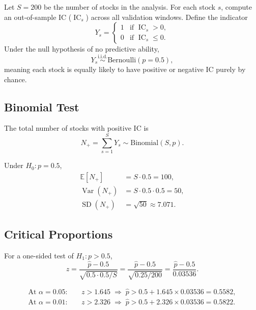 \documentclass[11pt,a4paper]{article}
\theoremstyle{definition}
\newcommand{\IC}{\operatorname{IC}}
\newcommand{\Var}{\operatorname{Var}}
\newcommand{\E}{\mathbb{E}}
\newcommand{\Ho}{H_{0}}
\newcommand{\Ha}{H_{1}}
\newcommand{\SD}{\operatorname{SD}}
\newcommand{\iid}{\overset{\text{i.i.d.}}{\sim}}
\begin{document}
Let $S = 200$ be the number of stocks in the analysis.  For each stock $s$,
compute an out-of-sample IC ($\IC_s$) across all validation windows.  Define
the indicator
\begin{equation}
    Y_s = \begin{cases}
        1 & \text{if } \IC_s > 0, \\
        0 & \text{if } \IC_s \leq 0.
    \end{cases}
\end{equation}
Under the null hypothesis of no predictive ability,
\begin{equation}
    Y_s \iid \text{Bernoulli}(p = 0.5),
\end{equation}
meaning each stock is equally likely to have positive or negative IC purely
by chance.

\subsection{Binomial Test}

The total number of stocks with positive IC is
\begin{equation}
    N_{+} = \sum_{s=1}^{S} Y_s \sim \text{Binomial}(S, p).
    \label{eq:binomial}
\end{equation}

Under $\Ho: p = 0.5$,
\begin{align}
    \E[N_{+}] &= S \cdot 0.5 = 100, \\
    \Var(N_{+}) &= S \cdot 0.5 \cdot 0.5 = 50, \\
    \SD(N_{+}) &= \sqrt{50} \approx 7.071.
\end{align}

\subsection{Critical Proportions}

For a one-sided test of $\Ha: p > 0.5$,
\begin{equation}
    z = \frac{\hat{p} - 0.5}{\sqrt{0.5 \cdot 0.5 / S}}
      = \frac{\hat{p} - 0.5}{\sqrt{0.25 / 200}}
      = \frac{\hat{p} - 0.5}{0.03536}.
\end{equation}

\begin{align}
    \text{At } \alpha = 0.05:\quad &z > 1.645
    \;\Longrightarrow\; \hat{p} > 0.5 + 1.645 \times 0.03536 = 0.5582, \\[4pt]
    \text{At } \alpha = 0.01:\quad &z > 2.326
    \;\Longrightarrow\; \hat{p} > 0.5 + 2.326 \times 0.03536 = 0.5822.
\end{align}
\end{document}
